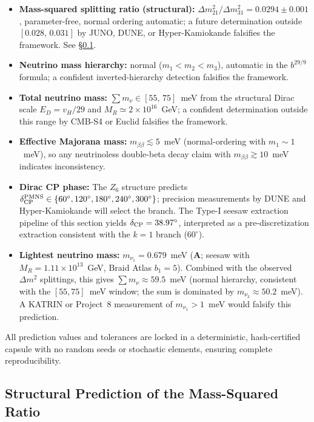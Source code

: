 \documentclass[11pt]{article}
\theoremstyle{remark}
\newcommand{\CatA}{\textbf{A}}
\begin{document}
\begin{itemize}[leftmargin=1.2em,itemsep=0.2em]
    \item \textbf{Mass-squared splitting ratio (structural):} $\Delta m^2_{21}/\Delta m^2_{31} = 0.0294 \pm 0.001$, parameter-free, normal ordering automatic; a future determination outside $[0.028,\,0.031]$ by JUNO, DUNE, or Hyper-Kamiokande falsifies the framework.  See \S\ref{subsec:neutrino_structural}.
    \item \textbf{Neutrino mass hierarchy:} normal ($m_1 < m_2 < m_3$), automatic in the $b^{29/9}$ formula; a confident inverted-hierarchy detection falsifies the framework.
    \item \textbf{Total neutrino mass:} $\sum m_\nu \in [55,\,75]$~meV from the structural Dirac scale $E_D = v_H/29$ and $M_R \simeq 2\times 10^{16}$~GeV; a confident determination outside this range by CMB-S4 or Euclid falsifies the framework.
    \item \textbf{Effective Majorana mass:} $m_{\beta\beta} \lesssim 5$~meV (normal-ordering with $m_1 \sim 1$~meV), so any neutrinoless double-beta decay claim with $m_{\beta\beta} \gtrsim 10$~meV indicates inconsistency.
    \item \textbf{Dirac CP phase:} The $Z_6$ structure predicts $\delta_{\rm CP}^{\rm PMNS} \in \{60^\circ, 120^\circ, 180^\circ, 240^\circ, 300^\circ\}$; precision measurements by DUNE and Hyper-Kamiokande will select the branch.  The Type-I seesaw extraction pipeline of this section yields $\delta_{\rm CP} = 38.97^\circ$, interpreted as a pre-discretization extraction consistent with the $k{=}1$ branch ($60^\circ$).
    \item \textbf{Lightest neutrino mass:} $m_{\nu_1} = 0.679$~meV (\CatA; seesaw with $M_R = 1.11\times10^{13}$~GeV, Braid Atlas $b_1 = 5$).  Combined with the observed $\Delta m^2$ splittings, this gives $\sum m_\nu \approx 59.5$~meV (normal hierarchy, consistent with the $[55, 75]$~meV window; the sum is dominated by $m_{\nu_3} \approx 50.2$~meV).  A KATRIN or Project~8 measurement of $m_{\nu_1} > 1$~meV would falsify this prediction.
\end{itemize}

All prediction values and tolerances are locked in a deterministic, hash-certified capsule with no random seeds or stochastic elements, ensuring complete reproducibility.


\subsection{Structural Prediction of the Mass-Squared Ratio}
\label{subsec:neutrino_structural}
\end{document}
